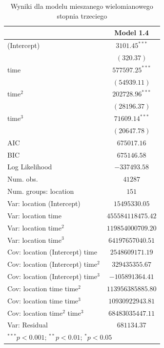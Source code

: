 \documentclass[12pt]{mwbk}
\theoremstyle{plain}
\theoremstyle{definition}
\theoremstyle{definition}
\begin{document}
\begin{table}[!h]
	\begin{center}
		\begin{tabular}{l c}
			\hline
			& Model 1.4 \\
			\hline
			(Intercept)                                 & $3101.45^{***}$   \\
			& $(320.37)$        \\
			time                              & $577597.25^{***}$ \\
			& $(54939.11)$      \\
			time$^2$                              & $202728.96^{***}$ \\
			& $(28196.37)$      \\
			time$^3$                              & $71609.14^{***}$  \\
			& $(20647.78)$      \\
			\hline
			AIC                                         & $675017.16$       \\
			BIC                                         & $675146.58$       \\
			Log Likelihood                              & $-337493.58$      \\
			Num. obs.                                   & $41287$           \\
			Num. groups: location                       & $151$             \\
			Var: location (Intercept)                   & $15495330.05$     \\
			Var: location time                & $455584118475.42$ \\
			Var: location time$^2$                & $119854000709.20$ \\
			Var: location time$^3$                & $64197657040.51$  \\
			Cov: location (Intercept) time    & $2548609171.19$   \\
			Cov: location (Intercept) time$^2$    & $329435355.67$    \\
			Cov: location (Intercept) time$^3$    & $-105891364.41$   \\
			Cov: location time time$^2$ & $113956385885.80$ \\
			Cov: location time time$^3$ & $10930922943.81$  \\
			Cov: location time$^2$ time$^3$ & $68483035447.11$  \\
			Var: Residual                               & $681134.37$       \\
			\hline
			\multicolumn{2}{l}{\scriptsize{$^{***}p<0.001$; $^{**}p<0.01$; $^{*}p<0.05$}}
		\end{tabular}
		\caption{Wyniki dla modelu mieszanego wielomianowego stopnia trzeciego}
		\label{table:mod1-poly}
	\end{center}
\end{table}
\end{document}
